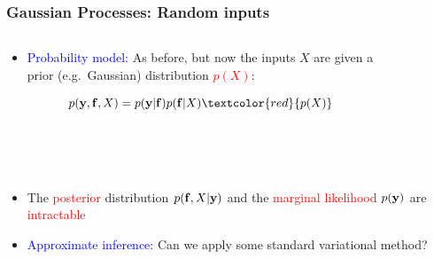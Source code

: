 \documentclass{beamer}
\begin{document}
\frame
{

\frametitle{Gaussian Processes: Random inputs}



\begin{columns}
\begin{column}[t]{8cm}

\begin{itemize}
\item \textcolor{blue}{Probability model:} As before, but now the inputs $X$ 
        are given a prior (e.g.\ Gaussian) distribution  \textcolor{red}{$p(X)$}: 

$$
p(\bfy,\bff,X) =  p(\bfy|\bff) p(\bff|X) \textcolor{red}{p(X)} 
$$


\end{itemize}

\end{column}

\begin{column}[t]{2cm}
\begin{figure}
\includegraphics[width=8mm,height=33mm]{../../../vargplvm/tex/diagrams/net}
\end{figure}

\end{column}
\end{columns}


\begin{itemize}

%
%
%
%
%
%

\item The \textcolor{red}{posterior} distribution $p(\mathbf{f},X|\mathbf{y})$ and the \textcolor{red}{marginal 
      likelihood} $p(\mathbf{y})$ are \textcolor{red}{intractable} 

\item \textcolor{blue}{Approximate inference:} Can we apply 
some standard variational  method? 
 

\end{itemize}




}
\end{document}
